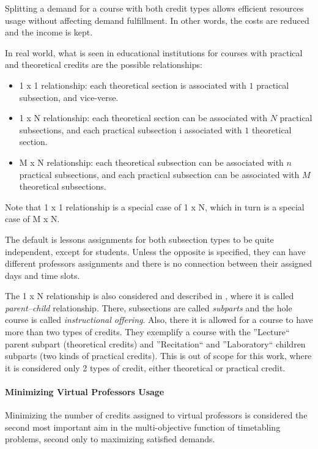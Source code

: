 Splitting a demand for a course with both credit types allows efficient resources usage without affecting demand fulfillment. In other words, the costs are reduced and the income is kept.

In real world, what is seen in educational institutions for courses with practical and theoretical credits are the possible relationships:
\begin{itemize}
\item 1 x 1 relationship: each theoretical section is associated with $1$ practical subsection, and vice-verse.
\item 1 x N relationship: each theoretical section can be associated with $N$ practical subsections, and each practical subsection i associated with $1$ theoretical section.
\item M x N relationship: each theoretical subsection can be associated with $n$ practical subsections, and each practical subsection can be associated with $M$ theoretical subsections.
\end{itemize}

Note that 1 x 1 relationship is a special case of 1 x N, which in turn is a special case of M x N.

The default is lessons assignments for both subsection types to be quite independent, except for students. Unless the opposite is specified, they can have different professors assignments and there is no connection between their assigned days and time slots.

The 1 x N relationship is also considered and described in \cite{Murray2007}, where it is called \textit{parent--child} relationship. There, subsections are called \textit{subparts} and the hole course is called \textit{instructional offering}. Also, there it is allowed for a course to have more than two types of credits. They exemplify a course with the ''Lecture`` parent subpart (theoretical credits) and ''Recitation`` and ''Laboratory`` children subparts (two kinds of practical credits). This is out of scope for this work, where it is considered only 2 types of credit, either theoretical or practical credit.


\paragraph{Minimizing Virtual Professors Usage}
\label{constrvirtprof}

Minimizing the number of credits assigned to virtual professors is considered the second most important aim in the multi-objective function of timetabling problems, second only to maximizing satisfied demands.

